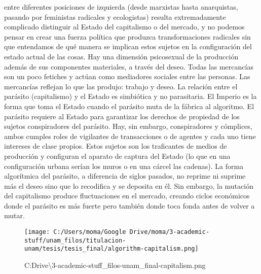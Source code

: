 \documentclass[
]{article}
\begin{document}
entre diferentes posiciones de izquierda (desde marxistas hasta
anarquistas, pasando por feministas radicales y ecologistas) resulta
extremadamente complicado distinguir al Estado del capitalismo o del
mercado, y no podemos pensar en crear una fuerza política que produzca
transformaciones radicales sin que entendamos de qué manera se implican
estos sujetos en la configuración del estado actual de las cosas. Hay
una dimensión psicosexual de la producción además de sus componentes
materiales, a través del deseo. Todas las mercancías son un poco
fetiches y actúan como mediadores sociales entre las personas. Las
mercancías reflejan lo que las produjo: trabajo y deseo. La relación
entre el parásito (capitalismo) y el Estado es simbiótica y no
parasitaria. El Imperio es la forma que toma el Estado cuando el
parásito muta de la fábrica al algoritmo. El parásito requiere al Estado
para garantizar los derechos de propiedad de los sujetos conspiradores
del parásito. Hay, sin embargo, conspiradores y cómplices, ambos cumples
roles de vigilantes de transacciones o de agentes y cada uno tiene
intereses de clase propios. Estos sujetos son los traficantes de medios
de producción y configuran el aparato de captura del Estado (lo que en
una configuración urbana serían los muros o en una cárcel las cadenas).
La forma algorítmica del parásito, a diferencia de siglos pasados, no
reprime ni suprime más el deseo sino que lo recodifica y se deposita en
él. Sin embargo, la mutación del capitalismo produce fluctuaciones en el
mercado, creando ciclos económicos donde el parásito es más fuerte pero
también donde toca fonda antes de volver a mutar.

\begin{figure}
\centering
\texttt{[image: C:/Users/moma/Google Drive/moma/3-academic-stuff/unam\_filos/titulacion-unam/tesis/tesis\_final/algorithm-capitalism.png]}
\caption{C:\Users\moma\Google Drive\moma\textbackslash3-academic-stuff\unam\_filos\titulacion-unam\tesis\tesis\_final\algorithm-capitalism.png}
\end{figure}
\end{document}
